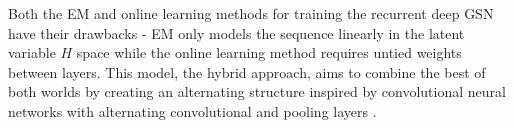 Both the EM and online learning methods for training the recurrent deep GSN have their drawbacks - EM only models the sequence linearly in the latent variable \(H\) space while the online learning method requires untied weights between layers. This model, the hybrid approach, aims to combine the best of both worlds by creating an alternating structure inspired by convolutional neural networks with alternating convolutional and pooling layers \cite{lenet5}.

